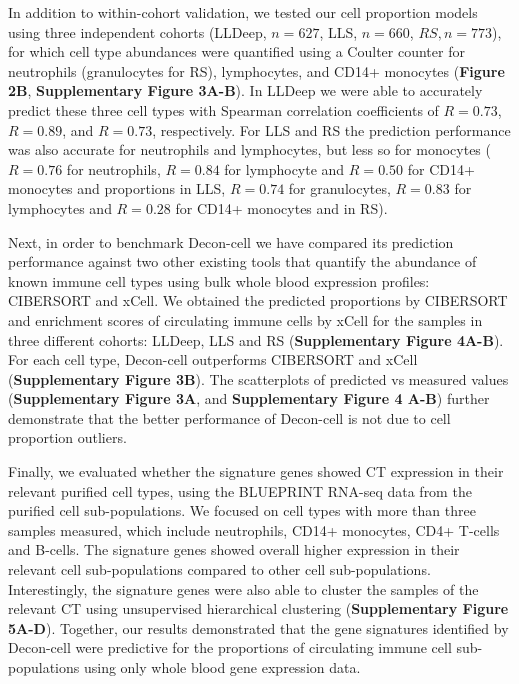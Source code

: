 In addition to within-cohort validation, we tested our cell proportion models using three independent cohorts (LLDeep, $n = 627$, LLS, $n = 660$, $RS, n = 773$), for which cell type abundances were quantified using a Coulter counter for neutrophils (granulocytes for RS), lymphocytes, and CD14+ monocytes (\textbf{Figure 2B}, \textbf{Supplementary Figure 3A-B}). In LLDeep we were able to accurately predict these three cell types with Spearman correlation coefficients of $R = 0.73$, $R = 0.89$, and $R = 0.73$, respectively.  For LLS and RS the prediction performance was also accurate for neutrophils and lymphocytes, but less so for monocytes ($R= 0.76$ for neutrophils, $R = 0.84$ for lymphocyte and $R = 0.50$ for CD14+ monocytes and proportions in LLS, $R = 0.74$ for granulocytes, $R = 0.83$ for lymphocytes and $R = 0.28$ for CD14+ monocytes and in RS). 

Next, in order to benchmark Decon-cell we have compared its prediction performance against two other existing tools that quantify the abundance of known immune cell types using bulk whole blood expression profiles: CIBERSORT\cite{newmanRobustEnumerationCell2015} and xCell\cite{aranXCellDigitallyPortraying2017}. We obtained the predicted proportions by CIBERSORT and enrichment scores of circulating immune cells by xCell for the samples in three different cohorts: LLDeep, LLS and RS (\textbf{Supplementary Figure 4A-B}). For each cell type, Decon-cell outperforms CIBERSORT and xCell (\textbf{Supplementary Figure 3B}). The scatterplots of predicted vs measured values  (\textbf{Supplementary Figure 3A}, and \textbf{Supplementary Figure 4 A-B}) further demonstrate that the better performance of Decon-cell is not due to cell proportion outliers.

Finally, we evaluated whether the signature genes showed CT expression in their relevant purified cell types, using the BLUEPRINT\cite{adamsBLUEPRINTDecodeEpigenetic2012} RNA-seq data from the purified cell sub-populations. We focused on cell types with more than three samples measured, which include neutrophils, CD14+ monocytes, CD4+ T-cells and B-cells. The signature genes showed overall higher expression in their relevant cell sub-populations compared to other cell sub-populations. Interestingly, the signature genes were also able to cluster the samples of the relevant CT using unsupervised hierarchical clustering (\textbf{Supplementary Figure 5A-D}). Together, our results demonstrated that the gene signatures identified by Decon-cell were predictive for the proportions of circulating immune cell sub-populations using only whole blood gene expression data.

